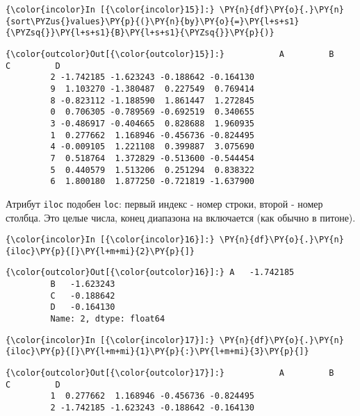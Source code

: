     \begin{Verbatim}[commandchars=\\\{\}]
{\color{incolor}In [{\color{incolor}15}]:} \PY{n}{df}\PY{o}{.}\PY{n}{sort\PYZus{}values}\PY{p}{(}\PY{n}{by}\PY{o}{=}\PY{l+s+s1}{\PYZsq{}}\PY{l+s+s1}{B}\PY{l+s+s1}{\PYZsq{}}\PY{p}{)}
\end{Verbatim}

            \begin{Verbatim}[commandchars=\\\{\}]
{\color{outcolor}Out[{\color{outcolor}15}]:}           A         B         C         D
         2 -1.742185 -1.623243 -0.188642 -0.164130
         9  1.103270 -1.380487  0.227549  0.769414
         8 -0.823112 -1.188590  1.861447  1.272845
         0  0.706305 -0.789569 -0.692519  0.340655
         3 -0.486917 -0.404665  0.828688  1.960935
         1  0.277662  1.168946 -0.456736 -0.824495
         4 -0.009105  1.221108  0.399887  3.075690
         7  0.518764  1.372829 -0.513600 -0.544454
         5  0.440579  1.513206  0.251294  0.838322
         6  1.800180  1.877250 -0.721819 -1.637900
\end{Verbatim}
        
    Атрибут \texttt{iloc} подобен \texttt{loc}: первый индекс - номер
строки, второй - номер столбца. Это целые числа, конец диапазона на
включается (как обычно в питоне).

    \begin{Verbatim}[commandchars=\\\{\}]
{\color{incolor}In [{\color{incolor}16}]:} \PY{n}{df}\PY{o}{.}\PY{n}{iloc}\PY{p}{[}\PY{l+m+mi}{2}\PY{p}{]}
\end{Verbatim}

            \begin{Verbatim}[commandchars=\\\{\}]
{\color{outcolor}Out[{\color{outcolor}16}]:} A   -1.742185
         B   -1.623243
         C   -0.188642
         D   -0.164130
         Name: 2, dtype: float64
\end{Verbatim}
        
    \begin{Verbatim}[commandchars=\\\{\}]
{\color{incolor}In [{\color{incolor}17}]:} \PY{n}{df}\PY{o}{.}\PY{n}{iloc}\PY{p}{[}\PY{l+m+mi}{1}\PY{p}{:}\PY{l+m+mi}{3}\PY{p}{]}
\end{Verbatim}

            \begin{Verbatim}[commandchars=\\\{\}]
{\color{outcolor}Out[{\color{outcolor}17}]:}           A         B         C         D
         1  0.277662  1.168946 -0.456736 -0.824495
         2 -1.742185 -1.623243 -0.188642 -0.164130
\end{Verbatim}
        
